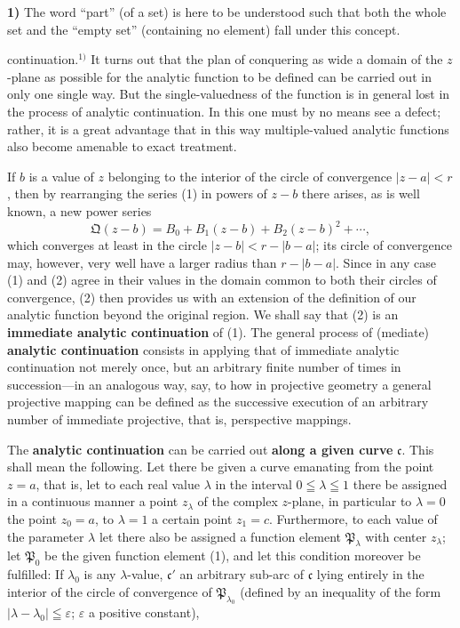 \documentclass{article}
\begin{document}
\textbf{1)} The word ``part'' (of a set) is here to be understood such that both the whole set and the ``empty set'' (containing no element) fall under this concept.

continuation.${}^{1)}$ It turns out that the plan of conquering as wide a domain of the $z$-plane as possible for the analytic function to be defined can be carried out in only one single way. But the single-valuedness of the function is in general lost in the process of analytic continuation. In this one must by no means see a defect; rather, it is a great advantage that in this way multiple-valued analytic functions also become amenable to exact treatment.

If $b$ is a value of $z$ belonging to the interior of the circle of convergence $|z - a| < r$, then by rearranging the series (1) in powers of $z - b$ there arises, as is well known, a new power series
\[ \mathfrak{Q}(z - b) = B_0 + B_1(z - b) + B_2(z - b)^2 + \cdots, \tag{2} \]
which converges at least in the circle $|z - b| < r - |b - a|$; its circle of convergence may, however, very well have a larger radius than $r - |b - a|$. Since in any case (1) and (2) agree in their values in the domain common to both their circles of convergence, (2) then provides us with an extension of the definition of our analytic function beyond the original region. We shall say that (2) is an \textbf{immediate analytic continuation} of (1). The general process of (mediate) \textbf{analytic continuation} consists in applying that of immediate analytic continuation not merely once, but an arbitrary finite number of times in succession---in an analogous way, say, to how in projective geometry a general projective mapping can be defined as the successive execution of an arbitrary number of immediate projective, that is, perspective mappings.

The \textbf{analytic continuation} can be carried out \textbf{along a given curve} $\mathfrak{c}$. This shall mean the following. Let there be given a curve emanating from the point $z = a$, that is, let to each real value $\lambda$ in the interval $0 \leqq \lambda \leqq 1$ there be assigned in a continuous manner a point $z_\lambda$ of the complex $z$-plane, in particular to $\lambda = 0$ the point $z_0 = a$, to $\lambda = 1$ a certain point $z_1 = c$. Furthermore, to each value of the parameter $\lambda$ let there also be assigned a function element $\mathfrak{P}_\lambda$ with center $z_\lambda$; let $\mathfrak{P}_0$ be the given function element (1), and let this condition moreover be fulfilled: If $\lambda_0$ is any $\lambda$-value, $\mathfrak{c}'$ an arbitrary sub-arc of $\mathfrak{c}$ lying entirely in the interior of the circle of convergence of $\mathfrak{P}_{\lambda_0}$ (defined by an inequality of the form $|\lambda - \lambda_0| \leqq \varepsilon$; $\varepsilon$ a positive constant),
\end{document}
